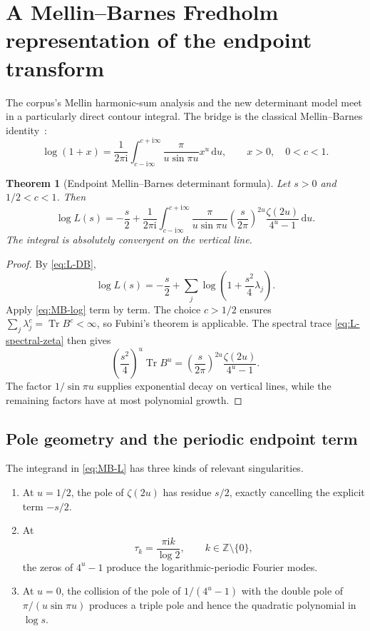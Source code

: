 \documentclass[11pt,oneside]{article}
\newtheorem{theorem}{Theorem}[section]
\theoremstyle{definition}
\newcommand{\dd}{\,\mathrm d}
\newcommand{\ii}{\mathrm i}
\newcommand{\Z}{\mathbb Z}
\newcommand{\Tr}{\operatorname{Tr}}
\begin{document}
\section{A Mellin--Barnes Fredholm representation of the endpoint transform}
\label{sec:MB}

The corpus's Mellin harmonic-sum analysis and the new determinant model meet in a
particularly direct contour integral.  The bridge is the classical Mellin--Barnes
identity~\cite{FlajoletGourdonDumas1995}:
\begin{equation}
 \log(1+x)=\frac1{2\pi\ii}
 \int_{c-\ii\infty}^{c+\ii\infty}
 \frac{\pi}{u\sin\pi u}x^u\dd u,
 \qquad x>0,\quad0<c<1.
 \label{eq:MB-log}
\end{equation}

\begin{theorem}[Endpoint Mellin--Barnes determinant formula]
\label{thm:MB}
Let \(s>0\) and \(1/2<c<1\).  Then
\begin{equation}
 \boxed{\quad
 \log L(s)=-\frac s2+\frac1{2\pi\ii}
 \int_{c-\ii\infty}^{c+\ii\infty}
 \frac{\pi}{u\sin\pi u}
 \left(\frac{s}{2\pi}\right)^{2u}
 \frac{\zeta(2u)}{4^u-1}\dd u.
 \quad}
 \label{eq:MB-L}
\end{equation}
The integral is absolutely convergent on the vertical line.
\end{theorem}

\begin{proof}
By \eqref{eq:L-DB},
\[
 \log L(s)=-\frac s2+\sum_j\log\left(1+\frac{s^2}{4}\lambda_j\right).
\]
Apply \eqref{eq:MB-log} term by term.  The choice \(c>1/2\) ensures
\(\sum_j\lambda_j^c=\Tr B^c<\infty\), so Fubini's theorem is applicable.  The
spectral trace \eqref{eq:L-spectral-zeta} then gives
\[
 \left(\frac{s^2}{4}\right)^u\Tr B^u
 =\left(\frac{s}{2\pi}\right)^{2u}
 \frac{\zeta(2u)}{4^u-1}.
\]
The factor \(1/\sin\pi u\) supplies exponential decay on vertical lines, while the
remaining factors have at most polynomial growth.
\end{proof}

\subsection{Pole geometry and the periodic endpoint term}

The integrand in \eqref{eq:MB-L} has three kinds of relevant singularities.

\begin{enumerate}[label=(\roman*),leftmargin=2.2em]
\item At \(u=1/2\), the pole of \(\zeta(2u)\) has residue \(s/2\), exactly cancelling
      the explicit term \(-s/2\).
\item At
\begin{equation}
 \tau_k=\frac{\pi\ii k}{\log2},\qquad k\in\Z\setminus\{0\},
 \label{eq:tau-k}
\end{equation}
      the zeros of \(4^u-1\) produce the logarithmic-periodic Fourier modes.
\item At \(u=0\), the collision of the pole of \(1/(4^u-1)\) with the double pole of
      \(\pi/(u\sin\pi u)\) produces a triple pole and hence the quadratic polynomial
      in \(\log s\).
\end{enumerate}
\end{document}
